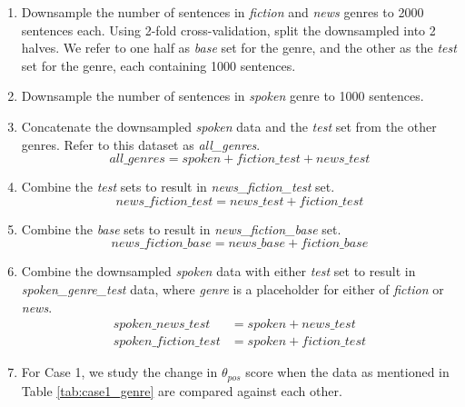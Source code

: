 \begin{enumerate}
    \item Downsample the number of sentences in \textit{fiction} and \textit{news} genres to 2000 sentences each. Using 2-fold cross-validation, split the downsampled into 2 halves. We refer to one half as \textit{base} set for the genre, and the other as the \textit{test} set for the genre, each containing 1000 sentences.
    \item Downsample the number of sentences in \textit{spoken} genre to 1000 sentences.
    \item Concatenate the downsampled \textit{spoken} data and the \textit{test} set from the other genres. Refer to this dataset as \textit{all\_genres}.
        \begin{equation*}
            \textit{all\_genres} = \textit{spoken} + \textit{fiction\_test} + \textit{news\_test}
        \end{equation*}
    \item Combine the \textit{test} sets to result in \textit{news\_fiction\_test} set.
        \begin{equation*}
            \textit{news\_fiction\_test} = \textit{news\_test} + \textit{fiction\_test}
        \end{equation*}
    \item Combine the \textit{base} sets to result in \textit{news\_fiction\_base} set.
        \begin{equation*}
            \textit{news\_fiction\_base} = \textit{news\_base} + \textit{fiction\_base}
        \end{equation*}
    \item Combine the downsampled \textit{spoken} data with either \textit{test} set to result in \textit{spoken\_genre\_test} data, where \textit{genre} is a placeholder for either of \textit{fiction} or \textit{news}.
        \begin{align*}
            \textit{spoken\_news\_test} & = \textit{spoken} + \textit{news\_test}\\
            \textit{spoken\_fiction\_test} &= \textit{spoken} + \textit{fiction\_test}
        \end{align*}
    \item For Case 1, we study the change in $\theta_{pos}$ score when the data as mentioned in Table \ref{tab:case1_genre} are compared against each other.
        \begin{table}[H]
            \centering
            \begin{tabular}{|c|c|}

\end{tabular}
\end{table}
\end{enumerate}
